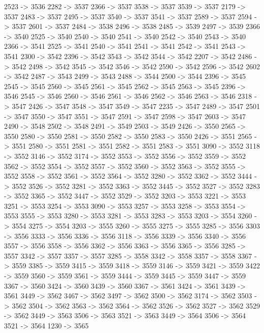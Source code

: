 {	2523 -> 3536
	2282 -> 3537
	2366 -> 3537
	3538 -> 3537
	3539 -> 3537
	2179 -> 3537
	2483 -> 3537
	2495 -> 3537
	3540 -> 3537
	3541 -> 3537
	2589 -> 3537
	2594 -> 3537
	2601 -> 3537
	2484 -> 3538
	2496 -> 3538
	2485 -> 3539
	2497 -> 3539
	2366 -> 3540
	2525 -> 3540
	2540 -> 3540
	2541 -> 3540
	2542 -> 3540
	2543 -> 3540
	2366 -> 3541
	2525 -> 3541
	2540 -> 3541
	2541 -> 3541
	2542 -> 3541
	2543 -> 3541
	2300 -> 3542
	2396 -> 3542
	3543 -> 3542
	3544 -> 3542
	2207 -> 3542
	2486 -> 3542
	2498 -> 3542
	3545 -> 3542
	3546 -> 3542
	2590 -> 3542
	2596 -> 3542
	2602 -> 3542
	2487 -> 3543
	2499 -> 3543
	2488 -> 3544
	2500 -> 3544
	2396 -> 3545
	2545 -> 3545
	2560 -> 3545
	2561 -> 3545
	2562 -> 3545
	2563 -> 3545
	2396 -> 3546
	2545 -> 3546
	2560 -> 3546
	2561 -> 3546
	2562 -> 3546
	2563 -> 3546
	2318 -> 3547
	2426 -> 3547
	3548 -> 3547
	3549 -> 3547
	2235 -> 3547
	2489 -> 3547
	2501 -> 3547
	3550 -> 3547
	3551 -> 3547
	2591 -> 3547
	2598 -> 3547
	2603 -> 3547
	2490 -> 3548
	2502 -> 3548
	2491 -> 3549
	2503 -> 3549
	2426 -> 3550
	2565 -> 3550
	2580 -> 3550
	2581 -> 3550
	2582 -> 3550
	2583 -> 3550
	2426 -> 3551
	2565 -> 3551
	2580 -> 3551
	2581 -> 3551
	2582 -> 3551
	2583 -> 3551
	3090 -> 3552
	3118 -> 3552
	3146 -> 3552
	3174 -> 3552
	3553 -> 3552
	3556 -> 3552
	3559 -> 3552
	3562 -> 3552
	3554 -> 3552
	3557 -> 3552
	3560 -> 3552
	3563 -> 3552
	3555 -> 3552
	3558 -> 3552
	3561 -> 3552
	3564 -> 3552
	3280 -> 3552
	3362 -> 3552
	3444 -> 3552
	3526 -> 3552
	3281 -> 3552
	3363 -> 3552
	3445 -> 3552
	3527 -> 3552
	3283 -> 3552
	3365 -> 3552
	3447 -> 3552
	3529 -> 3552
	3203 -> 3553
	3221 -> 3553
	3251 -> 3553
	3254 -> 3553
	3090 -> 3553
	3257 -> 3553
	3258 -> 3553
	3554 -> 3553
	3555 -> 3553
	3280 -> 3553
	3281 -> 3553
	3283 -> 3553
	3203 -> 3554
	3260 -> 3554
	3275 -> 3554
	3203 -> 3555
	3260 -> 3555
	3275 -> 3555
	3285 -> 3556
	3303 -> 3556
	3333 -> 3556
	3336 -> 3556
	3118 -> 3556
	3339 -> 3556
	3340 -> 3556
	3557 -> 3556
	3558 -> 3556
	3362 -> 3556
	3363 -> 3556
	3365 -> 3556
	3285 -> 3557
	3342 -> 3557
	3357 -> 3557
	3285 -> 3558
	3342 -> 3558
	3357 -> 3558
	3367 -> 3559
	3385 -> 3559
	3415 -> 3559
	3418 -> 3559
	3146 -> 3559
	3421 -> 3559
	3422 -> 3559
	3560 -> 3559
	3561 -> 3559
	3444 -> 3559
	3445 -> 3559
	3447 -> 3559
	3367 -> 3560
	3424 -> 3560
	3439 -> 3560
	3367 -> 3561
	3424 -> 3561
	3439 -> 3561
	3449 -> 3562
	3467 -> 3562
	3497 -> 3562
	3500 -> 3562
	3174 -> 3562
	3503 -> 3562
	3504 -> 3562
	3563 -> 3562
	3564 -> 3562
	3526 -> 3562
	3527 -> 3562
	3529 -> 3562
	3449 -> 3563
	3506 -> 3563
	3521 -> 3563
	3449 -> 3564
	3506 -> 3564
	3521 -> 3564
	1230 -> 3565
}
